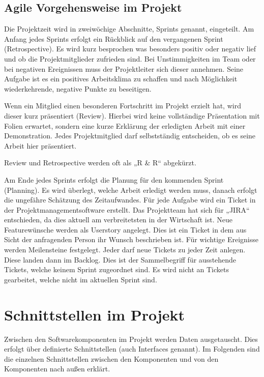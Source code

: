 \section{Agile Vorgehensweise im Projekt}
\label{sec:agile_vorgehensweise}
Die Projektzeit wird in zweiwöchige Abschnitte, Sprints genannt, eingeteilt. Am
Anfang jedes Sprints erfolgt ein Rückblick auf den vergangenen Sprint
(Retrospective). Es wird kurz besprochen was besonders positiv oder negativ
lief und ob die Projektmitglieder zufrieden sind. Bei Unstimmigkeiten im Team
oder bei negativen Ereignissen muss der Projektleiter sich dieser annehmen.
Seine Aufgabe ist es ein positives Arbeitsklima zu schaffen und nach
Möglichkeit wiederkehrende, negative Punkte zu beseitigen.

Wenn ein Mitglied einen besonderen Fortschritt im Projekt erzielt hat, wird
dieser kurz präsentiert (Review). Hierbei wird keine vollständige Präsentation
mit Folien erwartet, sondern eine kurze Erklärung der erledigten Arbeit mit
einer Demonstration. Jedes Projektmitglied darf selbstständig entscheiden, ob
es seine Arbeit hier präsentiert.

Review und Retrospective werden oft als „R \& R“ abgekürzt.

Am Ende jedes Sprints erfolgt die Planung für den kommenden Sprint (Planning).
Es wird überlegt, welche Arbeit erledigt werden muss, danach erfolgt die
ungefähre Schätzung des Zeitaufwandes. Für jede Aufgabe wird ein Ticket in der
Projektmanagementsoftware erstellt. Das Projektteam hat sich für „JIRA“
entschieden, da dies aktuell am verbreitetsten in der Wirtschaft ist. Neue
Featurewünsche werden als Userstory angelegt. Dies ist ein Ticket in dem aus
Sicht der anfragenden Person ihr Wunsch beschrieben ist. Für wichtige
Ereignisse werden Meilensteine festgelegt. Jeder darf neue Tickets zu jeder
Zeit anlegen. Diese landen dann im \gls{Backlog}. Dies ist der Sammelbegriff
für ausstehende Tickets, welche keinem Sprint zugeordnet sind. Es wird nicht an
Tickets gearbeitet, welche nicht im aktuellen Sprint sind.
\tm%

\chapter{Schnittstellen im Projekt}
Zwischen den Softwarekomponenten im Projekt werden Daten ausgetauscht. Dies
erfolgt über definierte Schnittstellen (auch Interfaces genannt). Im Folgenden
sind die einzelnen Schnittstellen zwischen den Komponenten und von den
Komponenten nach außen erklärt.
\tm%


